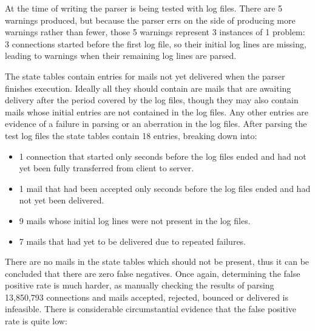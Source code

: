 At the time of writing the parser is being tested with \numberOFlogFILES{}
log files.  There are 5 warnings produced, but because the parser errs on
the side of producing more warnings rather than fewer, those 5 warnings
represent 3 instances of 1 problem: 3 connections started before the first
log file, so their initial log lines are missing, leading to warnings when
their remaining log lines are parsed.

The state tables contain entries for mails not yet delivered when the
parser finishes execution.  Ideally all they should contain are mails that
are awaiting delivery after the period covered by the log files, though
they may also contain mails whose initial entries are not contained in the
log files.  Any other entries are evidence of a failure in parsing or an
aberration in the log files.  After parsing the \numberOFlogFILES{} test
log files the state tables contain 18 entries, breaking down into:

\begin{itemize}

    \item 1 connection that started only seconds before the log files
        ended and had not yet been fully transferred from client to server.

    \item 1 mail that had been accepted only seconds before the log files
        ended and had not yet been delivered.

    \item 9 mails whose initial log lines were not present in the log
        files.

    \item 7 mails that had yet to be delivered due to repeated failures.

\end{itemize}

There are no mails in the state tables which should not be present, thus it
can be concluded that there are zero false negatives.  Once again,
determining the false positive rate is much harder, as manually checking
the results of parsing 13,850,793 connections and mails accepted, rejected,
bounced or delivered is infeasible.  There is considerable circumstantial
evidence that the false positive rate is quite low:

